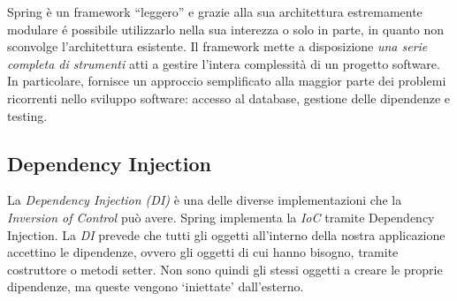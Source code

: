 Spring è un framework “leggero” e grazie alla sua architettura estremamente modulare é possibile utilizzarlo nella sua interezza o solo in parte, in quanto non sconvolge l'architettura esistente. Il framework mette a disposizione \emph{una serie completa di strumenti} atti a gestire l’intera complessità di un progetto software. In particolare, fornisce un approccio semplificato alla maggior parte dei problemi ricorrenti nello sviluppo software: accesso al database, gestione delle dipendenze e testing.

\subsection{Dependency Injection}
La \emph{Dependency Injection (DI)} è una delle diverse implementazioni che la \emph{Inversion of Control} può avere. Spring implementa la \emph{IoC} tramite Dependency Injection. La \emph{DI} prevede che tutti gli oggetti all’interno della nostra applicazione accettino le dipendenze, ovvero gli oggetti di cui hanno bisogno, tramite costruttore o metodi setter. Non sono quindi gli stessi oggetti a creare le proprie dipendenze, ma queste vengono `iniettate' dall’esterno.

